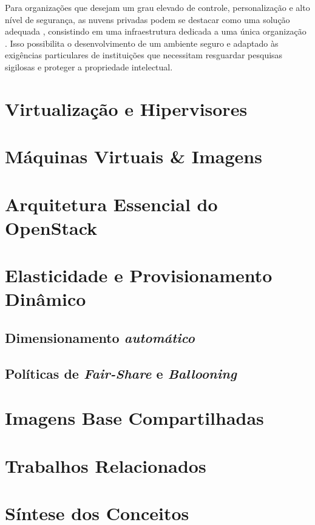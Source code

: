 Para organizações que desejam um grau elevado de controle, personalização e alto nível de segurança, as nuvens privadas podem se destacar como uma solução adequada \cite{swapna2023}, consistindo em uma infraestrutura dedicada a uma única organização \cite{mell2011}. Isso possibilita o desenvolvimento de um ambiente seguro e adaptado às exigências particulares de instituições que necessitam resguardar pesquisas sigilosas e proteger a propriedade intelectual. 

\section{Virtualização e Hipervisores}

\section{Máquinas Virtuais \& Imagens}

\section{Arquitetura Essencial do OpenStack}

\section{Elasticidade e Provisionamento Dinâmico}

\subsection{Dimensionamento \textit{automático}}

\subsection{Políticas de \textit{Fair-Share} e \textit{Ballooning}}

\section{Imagens Base Compartilhadas}

\section{Trabalhos Relacionados}

\section{Síntese dos Conceitos}
